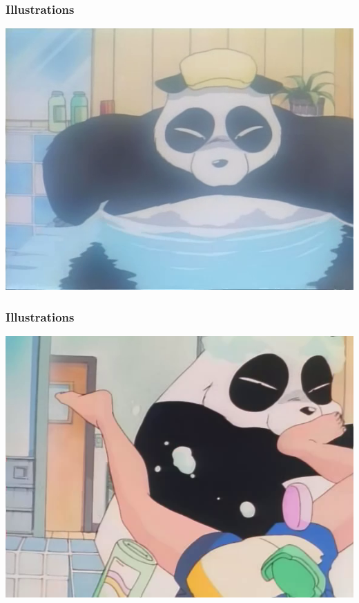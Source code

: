 \documentclass{beamer}
\begin{document}
\begin{frame}
\frametitle{Illustrations}
\begin{center}
\includegraphics[scale=0.5]{./images/Leak02.png}
\end{center}
\end{frame}

\begin{frame}
\frametitle{Illustrations}
\begin{center}
\includegraphics[scale=0.5]{./images/Leak03.png}
\end{center}
\end{frame}
\end{document}
